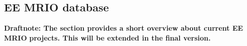\subsection{EE MRIO database}

\textbf{Draftnote: The section provides a short overview about current EE MRIO}
\textbf{projects. This will be extended in the final version.}